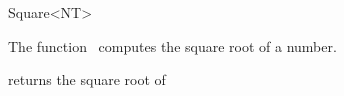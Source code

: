 \begin{ccRefFunctionObjectClass}{Square<NT>}

\ccDefinition

The function \ccRefName\ computes the square root of a number.


\ccIsModel
{}

{returns the square root of }

\end{ccRefFunctionObjectClass}
